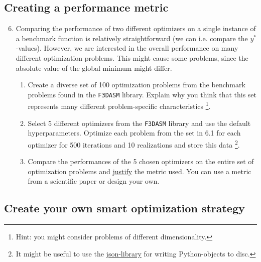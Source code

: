 \documentclass[10pt,a4paper,twoside]{article} %
\def\code#1{\texttt{#1}}
\begin{document}
\subsection*{Creating a performance metric}

\begin{enumerate}
    \setcounter{enumi}{5}
    \item Comparing the performance of two different optimizers on a single instance of a benchmark function is relatively straightforward (we can i.e. compare the $y^*$-values). However, we are interested in the overall performance on many different optimization problems. This might cause some problems, since the absolute value of the global minimum might differ.
    
    \begin{enumerate} [label*=\arabic*.]
        \item Create a diverse set of 100 optimization problems from the benchmark problems found in the \code{F3DASM} library. Explain why you think that this set represents many different problem-specific characteristics \footnote{Hint: you might consider problems of different dimensionality.}.
        
        \item Select 5 different optimizers from the \code{F3DASM} library and use the default hyperparameters. Optimize each problem from the set in 6.1 for each optimizer for 500 iterations and 10 realizations and store this data \footnote{It might be useful to use the \href{https://docs.python.org/3/library/json.html}{json-library} for writing Python-objects to disc. }.
        
        \item Compare the performances of the 5 chosen optimizers on the entire set of optimization problems and \underline{justify} the metric used. You can use a metric from a scientific paper or design your own.
        
    \end{enumerate}
    
\end{enumerate}

\subsection*{Create your own smart optimization strategy}
\end{document}
